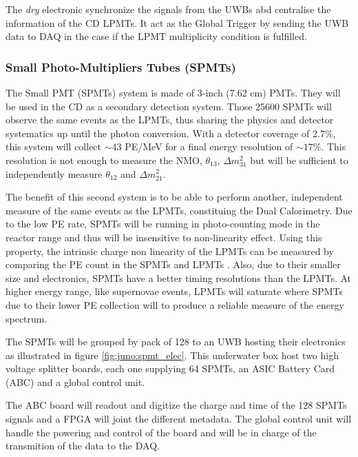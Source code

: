\documentclass[../main.tex]{subfiles}
\begin{document}
The \textit{dry} electronic synchronize the signals from the UWBs abd centralise the information of the CD LPMTs. It act as the Global Trigger by sending the UWB data to DAQ in the case if the LPMT multiplicity condition is fulfilled.


\subsubsection{Small Photo-Multipliers Tubes (SPMTs)}
\label{sec:juno:SPMT}

The Small PMT (SPMTs) system is made of 3-inch (7.62 cm) PMTs. They will be used in the CD as a secondary detection system. Those 25600 SPMTs will observe the same events as the LPMTs, thus sharing the physics and detector systematics up until the photon conversion. With a detector coverage of 2.7\%, this system will collect $\sim 43$ PE/MeV for a final energy resolution of $\sim 17\%$. This resolution is not enough to measure the NMO, $\theta_{13}$, $\Delta m^2_{31}$ but will be sufficient to independently measure $\theta_{12}$ and $\Delta m^2_{21}$.

The benefit of this second system is to be able to perform another, independent measure of the same events as the LPMTs, constituing the Dual Calorimetry.
Due to the low PE rate, SPMTs will be running in photo-counting mode in the reactor range and thus will be insensitive to non-linearity effect. Using this property, the intrinsic charge non linearity of the LPMTs can be measured by comparing the PE count in the SPMTs and LPMTs \cite{han_dual_2021}. Also, due to their smaller size and electronics, SPMTs have a better timing resolutions than the LPMTs.
At higher energy range, like supernovae events, LPMTs will saturate where SPMTs due to their lower PE collection will to produce a reliable measure of the energy spectrum.

The SPMTs will be grouped by pack of 128 to an UWB hosting their electronics as illustrated in figure \ref{fig:juno:spmt_elec}. This underwater box host two high voltage splitter boards, each one supplying 64 SPMTs, an ASIC Battery Card (ABC) and a global control unit.

The ABC board will readout and digitize the charge and time of the 128 SPMTs signals and a FPGA will joint the different metadata. The global control unit will handle the powering and control of the board and will be in charge of the transmition of the data to the DAQ.
\end{document}
